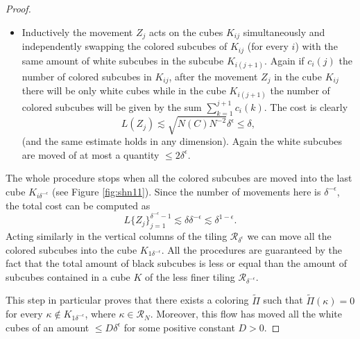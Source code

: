 \documentclass[12 pt]{article}
\theoremstyle{definition} \newtheorem{definition}{Definition}[section]
\theoremstyle{definition} \newtheorem{remark}[definition]{Remark}
\theoremstyle{plain} \newtheorem{lemma}[definition]{Lemma}
\theoremstyle{plain} \newtheorem{proposition}[definition]{Proposition}
\theoremstyle{plain} \newtheorem{theorem}[definition]{Theorem}
\theoremstyle{plain} \newtheorem{corollary}[definition]{Corollary}
\theoremstyle{definition} \newtheorem{example}[definition]{Example}
\theoremstyle{definition} \newtheorem{assumption}[definition]{Assumption}
\theoremstyle{definition} \newtheorem{conjecture}[definition]{Conjecture}
\newcommand{\1}{\mathbbm 1}
\numberwithin{equation}{section}
\begin{document}
\begin{proof}
\begin{itemize}
    \item Inductively the movement $Z_j$ acts on the cubes $K_{ij}$ simultaneously and independently swapping the colored subcubes of $K_{ij}$ (for every $i$) with the same amount of white subcubes in the subcube $K_{i(j+1)}$. Again if  $c_i(j)$ the number of colored subcubes in $K_{ij}$, after the movement $Z_j$ in the cube $K_{ij}$ there will be only white cubes while in the cube $K_{i(j+1)}$ the number of colored subcubes will be given by the sum $\sum_{k=1}^{j+1} c_i(k)$. The cost is clearly 
     \begin{equation*}
        L(Z_j)\lesssim \sqrt{N(C)N^{-2}}\delta^\epsilon\leq\delta,
    \end{equation*}
    (and the same estimate holds in any dimension). Again the white subcubes are moved of at most a quantity $\leq 2\delta^\epsilon$.
\end{itemize}
The whole procedure stops when all the colored subcubes are moved into the last cube $K_{i\delta^{-\epsilon}}$ (see Figure \ref{fig:shn11}). Since the number of movements here is $\delta^{-\epsilon}$, the total cost can be computed as
\begin{equation*}
    L\lbrace{Z_j}\rbrace_{j=1}^{\delta^{-\epsilon}-1}\lesssim \delta\delta^{-\epsilon}\lesssim\delta^{1-\epsilon}.
\end{equation*}
Acting similarly in the vertical columns of the tiling $\mathcal R_{\delta^\epsilon}$ we can move all the colored subcubes into the cube $K_{1\delta^{-\epsilon}}$. All the procedures are guaranteed by the fact that the total amount of black subcubes is less or equal than the amount of subcubes contained in a cube $K$ of the less finer tiling $\mathcal{R}_{\delta^{-\epsilon}}$.

\medskip

This step in particular proves that there exists a coloring $\tilde\Pi$ such that $\tilde\Pi(\kappa)=0$ for every $\kappa\not\in K_{1\delta^{-\epsilon}}$, where $\kappa\in \mathcal{R}_N$. Moreover, this flow has moved all the white cubes of an amount $\leq D\delta^\epsilon$ for some positive constant $D>0$.  

\medskip




\end{proof}
\end{document}
